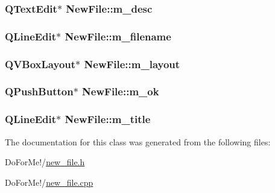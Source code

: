 \hypertarget{class_new_file_a4e8acb2f5d49650d02091ad0f13efe2b}{
\subsubsection[{m\-\_\-desc}]{\setlength{\rightskip}{0pt plus 5cm}Q\-Text\-Edit$\ast$ New\-File\-::m\-\_\-desc\hspace{0.3cm}{\ttfamily [private]}}}\label{class_new_file_a4e8acb2f5d49650d02091ad0f13efe2b}
\hypertarget{class_new_file_a704a088fc295fe1955622d650140fb7b}{
\subsubsection[{m\-\_\-filename}]{\setlength{\rightskip}{0pt plus 5cm}Q\-Line\-Edit$\ast$ New\-File\-::m\-\_\-filename\hspace{0.3cm}{\ttfamily [private]}}}\label{class_new_file_a704a088fc295fe1955622d650140fb7b}
\hypertarget{class_new_file_ae1f1622f7085837c92cf74447f528067}{
\subsubsection[{m\-\_\-layout}]{\setlength{\rightskip}{0pt plus 5cm}Q\-V\-Box\-Layout$\ast$ New\-File\-::m\-\_\-layout\hspace{0.3cm}{\ttfamily [private]}}}\label{class_new_file_ae1f1622f7085837c92cf74447f528067}
\hypertarget{class_new_file_ac82cb6bf4298f5cf09977ea0b7262ae6}{
\subsubsection[{m\-\_\-ok}]{\setlength{\rightskip}{0pt plus 5cm}Q\-Push\-Button$\ast$ New\-File\-::m\-\_\-ok\hspace{0.3cm}{\ttfamily [private]}}}\label{class_new_file_ac82cb6bf4298f5cf09977ea0b7262ae6}
\hypertarget{class_new_file_acfe55b221fa102b6e242b003fa22434b}{
\subsubsection[{m\-\_\-title}]{\setlength{\rightskip}{0pt plus 5cm}Q\-Line\-Edit$\ast$ New\-File\-::m\-\_\-title\hspace{0.3cm}{\ttfamily [private]}}}\label{class_new_file_acfe55b221fa102b6e242b003fa22434b}


The documentation for this class was generated from the following files\-:\begin{DoxyCompactItemize}
\item 
Do\-For\-Me!/\hyperlink{new__file_8h}{new\-\_\-file.\-h}\item 
Do\-For\-Me!/\hyperlink{new__file_8cpp}{new\-\_\-file.\-cpp}\end{DoxyCompactItemize}

